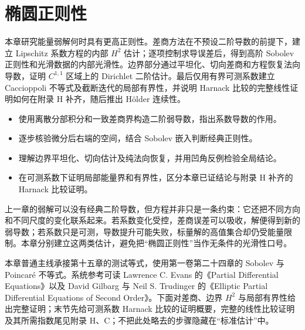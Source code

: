 \chapter{椭圆正则性}
\label{b2:ch:16}
\begin{chapterabstract}
本章研究能量弱解何时具有更高正则性。差商方法在不预设二阶导数的前提下，建立 Lipschitz 系数方程的内部 \(H^2\) 估计；逐项控制求导误差后，得到高阶 Sobolev 正则性和光滑数据的内部光滑性。边界部分通过平坦化、切向差商和方程恢复法向导数，证明 \(C^{1,1}\) 区域上的 Dirichlet 二阶估计。最后仅用有界可测系数建立 Caccioppoli 不等式及截断迭代的局部有界性，并说明 Harnack 比较的完整线性证明如何在附录 H 补齐，随后推出 Hölder 连续性。
\end{chapterabstract}

\begin{learninggoals}
\begin{itemize}
\item\label{b2:item:16-goal-difference}使用离散分部积分和一致差商界构造二阶弱导数，指出系数导数的作用。
\item\label{b2:item:16-goal-bootstrap}逐步核验微分后右端的空间，结合 Sobolev 嵌入判断经典正则性。
\item\label{b2:item:16-goal-boundary}理解边界平坦化、切向估计及纯法向恢复，并用凹角反例检验全局结论。
\item\label{b2:item:16-goal-low}在可测系数下证明局部能量界和有界性，区分本章已证结论与附录 H 补齐的 Harnack 比较证明。
\end{itemize}
\end{learninggoals}

上一章的弱解可以没有经典二阶导数，但方程并非只是一条约束：它还把不同方向和不同尺度的变化联系起来。若系数变化受控，差商误差可以吸收，解便得到新的弱导数；若系数只是可测，导数提升可能失败，标量解的高值集合却仍受能量限制。本章分别建立这两类估计，避免把“椭圆正则性”当作无条件的光滑性口号。

\ProseParagraphBreak

本章普通主线承接第十五章的测试等式，使用第一卷第二十四章的 Sobolev 与 Poincaré 不等式。系统参考可读 Lawrence C. Evans 的《Partial Differential Equations》\cite{Evans2010Partial}以及 David Gilbarg 与 Neil S. Trudinger 的《Elliptic Partial Differential Equations of Second Order》\cite{Gilbarg2001Elliptic}。下面对差商、边界 \(H^2\) 与局部有界性给出完整证明；末节先给可测系数 Harnack 比较的证明概要，完整的线性比较证明及其所需指数尾见附录 H、C；不把此处略去的步骤隐藏在“标准估计”中。

